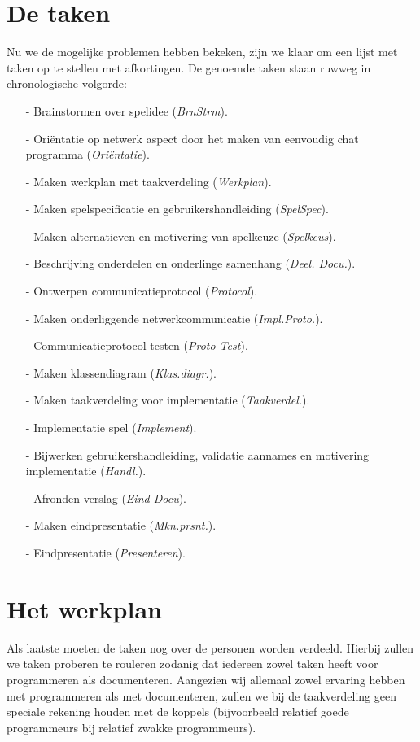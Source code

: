 \documentclass[a4paper,11pt]{article}
\newcommand{\BS}{BrnStrm}
\newcommand{\ON}{Ori\"entatie}
\newcommand{\MW}{Werkplan}
\newcommand{\MS}{SpelSpec}
\newcommand{\MA}{Spelkeus}
\newcommand{\BO}{Deel. Docu.}
\newcommand{\OC}{Protocol}
\newcommand{\MN}{Impl.Proto.}
\newcommand{\CT}{Proto Test}
\newcommand{\MK}{Klas.diagr.}
\newcommand{\MT}{Taakverdel.}
\newcommand{\IS}{Implement}
\newcommand{\BG}{Handl.}
\newcommand{\AV}{Eind Docu}
\newcommand{\ME}{Mkn.prsnt.}
\newcommand{\EP}{Presenteren}
\begin{document}
    \section{De taken}
    Nu we de mogelijke problemen hebben bekeken, zijn we klaar om een lijst met taken op te stellen met afkortingen. De genoemde taken staan ruwweg in chronologische volgorde:
    \begin{enumerate}
    \item[-] Brainstormen over spelidee (\emph{\BS}).
    \item[-] Ori\"entatie op netwerk aspect door het maken van eenvoudig chat programma (\emph{\ON}).
    \item[-] Maken werkplan met taakverdeling (\emph{\MW}).
    \item[-] Maken spelspecificatie en gebruikershandleiding (\emph{\MS}).
    \item[-] Maken alternatieven en motivering van spelkeuze (\emph{\MA}).
    \item[-] Beschrijving onderdelen en onderlinge samenhang (\emph{\BO}).
    \item[-] Ontwerpen communicatieprotocol (\emph{\OC}).
    \item[-] Maken onderliggende netwerkcommunicatie (\emph{\MN}).
    \item[-] Communicatieprotocol testen (\emph{\CT}).
    \item[-] Maken klassendiagram (\emph{\MK}).
    \item[-] Maken taakverdeling voor implementatie (\emph{\MT}).
    \item[-] Implementatie spel (\emph{\IS}).
    \item[-] Bijwerken gebruikershandleiding, validatie aannames en motivering implementatie (\emph{\BG}).
    \item[-] Afronden verslag (\emph{\AV}).
    \item[-] Maken eindpresentatie (\emph{\ME}).
    \item[-] Eindpresentatie (\emph{\EP}).
    \end{enumerate}

    \section{Het werkplan}
    Als laatste moeten de taken nog over de personen worden verdeeld. Hierbij zullen we taken proberen te rouleren zodanig dat iedereen zowel taken heeft voor programmeren als documenteren. Aangezien wij allemaal zowel ervaring hebben met programmeren als met documenteren, zullen we bij de taakverdeling geen speciale rekening houden met de koppels (bijvoorbeeld relatief goede programmeurs bij relatief zwakke programmeurs).
\end{document}
